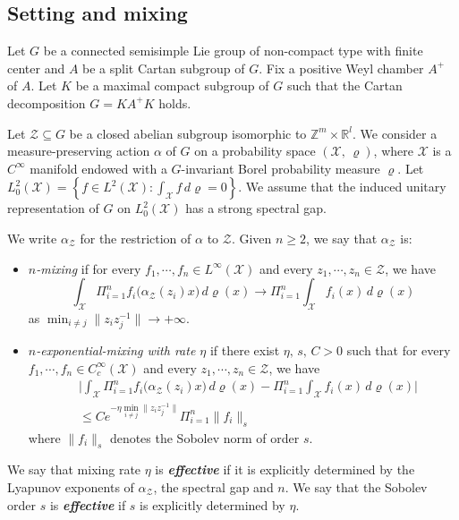 \documentclass[11 pt]{amsart}
\newcommand{\RR}{\mathbb{R}}
\newcommand{\ZZ}{\mathbb{Z}}
\newcommand{\norm}[1]{\lVert#1\rVert}
\theoremstyle{definition}
\numberwithin{equation}{section}
\begin{document}
\subsection{Setting and mixing} Let $G$ be a connected semisimple Lie group of non-compact type with finite center and $A$ be a split Cartan subgroup of $G$. Fix a positive Weyl chamber $A^+$ of $A$. Let $K$ be a maximal compact subgroup of $G$ such
that the Cartan decomposition $G=KA^+K$ holds.





Let $\mathcal{Z}\subseteq G$ be a closed abelian subgroup isomorphic to $\ZZ^m\times \RR^l$.  We consider a measure-preserving action $\alpha$ of $G$ on a probability space $(\mathcal{X},\,\varrho)$, where $\mathcal X$ is a $C^\infty$ manifold endowed with a $G$-invariant Borel probability measure $\varrho$. Let $L^2_0(\mathcal X)
=
\left\{f\in L^2(\mathcal X):\int_{\mathcal X}f\,d\varrho=0\right\}$. We assume that the induced unitary representation
of \(G\) on \(L^2_0(\mathcal X)\) has a strong spectral gap.

We write $\alpha_{\mathcal Z}$ for the restriction of $\alpha$ to $\mathcal Z$.
 Given \( n \ge 2 \), we say that $\alpha_\mathcal{Z}$ is:
\begin{itemize}
  \item \emph{\(n\)-mixing} if for every $f_1,\cdots, f_n\in L^\infty(\mathcal{X})$ and every $z_1,\cdots, z_n\in \mathcal{Z}$,  we have
\[
\int_{\mathcal{X}} \Pi_{i=1}^{n} f_i\big(\alpha_\mathcal{Z}(z_i)x\big) \, d\varrho(x) \longrightarrow \Pi_{i=1}^{n} \int_{\mathcal{X}} f_i(x) \, d\varrho(x)
\]
as $\min_{i \neq j} \norm{z_iz_j^{-1}} \to +\infty$.

\smallskip
  \item \emph{\(n\)-exponential-mixing with rate $\eta$} if there exist $\eta,\,s,\,C>0$ such that for every $f_1,\cdots, f_n\in C_c^\infty(\mathcal{X})$ and every $z_1,\cdots, z_n\in \mathcal{Z}$,  we have
  \begin{align*}
   &\Big|\int_{\mathcal{X}} \Pi_{i=1}^{n} f_i\big(\alpha_\mathcal{Z}(z_i)x\big) \, d\varrho(x) - \Pi_{i=1}^{n} \int_{\mathcal{X}} f_i(x) \, d\varrho(x)\Big|\\
   &\leq Ce^{-\eta\min_{i \neq j} \norm{z_iz_j^{-1}}}\Pi_{i=1}^{n} \|f_i\|_s
  \end{align*}
  where $\|f_i\|_s$ denotes the Sobolev
norm of order $s$.




\end{itemize}
We say that mixing rate $\eta$  is \textbf{\emph{effective}} if it is explicitly determined by the Lyapunov exponents of $\alpha_\mathcal{Z}$,  the spectral gap and $n$.
We say that the Sobolev order $s$ is \textbf{\emph{effective}} if $s$ is explicitly determined by $\eta$.
\end{document}
